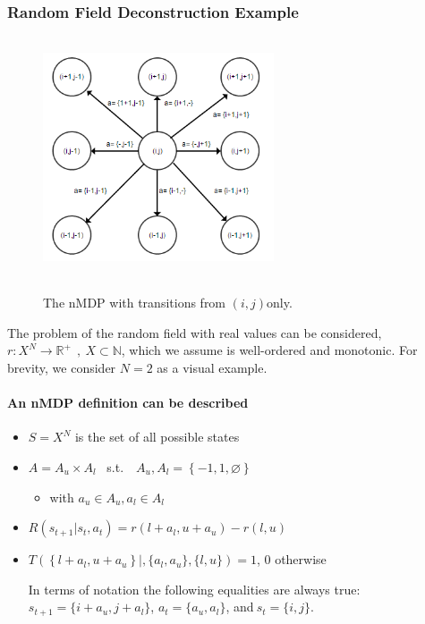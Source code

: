\documentclass[compsoc,journal,letterpaper,10pt,draftclsnofoot,onecolumn]{IEEEtran}
\begin{document}
\subsubsection{Random Field Deconstruction
Example}\label{random-field-deconstruction-example}

\begin{figure}
\includegraphics[width=2.68750in,height=2.80556in]{media/image1.png}\\
\caption{\label{fig:figure1}The nMDP with transitions from \((i,j)\)only.}
\end{figure}

The
problem of the random field with real values can be considered,
\(r:X^{N} \rightarrow \mathbb{R}^{+}\ \ ,\ X\mathbb{\subset N}\), which
we assume is well-ordered and monotonic. For brevity, we consider
\(N = 2\) as a visual example.

\paragraph{An nMDP definition can be
described}\label{an-nmdp-definition-can-be-described}

\begin{itemize}
\item
  \(S = X^{N}\) is the set of all possible states
\item
  \(A = A_{u} \times A_{l} \) \ s.t.\  \ 
  \( A_{u}, A_{l} = \left\{ - 1,1,\varnothing \right\}\)

  \begin{itemize}
  \item
    with \(a_{u} \in A_{u}, a_{l} \in A_{l}\)
  \end{itemize}
\item
  \(R\left( s_{t + 1}|s_{t}, a_{t} \right) = r\left( l + a_{l}, u + a_{u} \right) - r(l,u)\)
\item
  \(T\left( \left\{ l + a_{l},u + a_{u} \right\}|,\{ a_{l},a_{u}\},\{ l,u\} \right) = 1\),
  \(0\) otherwise

  In terms of notation the following equalities are always true:
  \(s_{t + 1} = \{ i + a_{u}, j + a_{l}\}\), \(a_{t} = \{ a_{u},a_{l}\}\), and\(\ s_{t} = \{ i,j\}\).
\end{itemize}
\end{document}
